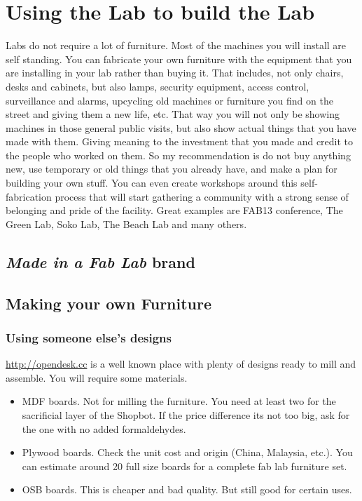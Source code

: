 \documentclass[a4paper,12pt,titlepage]{article}
\begin{document}
\section{Using the Lab to build the Lab}
Labs do not require a lot of furniture. Most of the machines you will install are self standing. You can fabricate your own furniture with the equipment that you are installing in your lab rather than buying it. That includes, not only chairs, desks and cabinets, but also lamps, security equipment, access control, surveillance and alarms, upcycling old machines or furniture you find on the street and giving them a new life, etc. That way you will not only be showing machines in those general public visits, but also show actual things that you have made with them. Giving meaning to the investment that you made and credit to the people who worked on them. So my recommendation is do not buy anything new, use temporary or old things that you already have, and make a plan for building your own stuff. You can even create workshops around this self-fabrication process that will start gathering a community with a strong sense of belonging and pride of the facility. Great examples are FAB13 conference, The Green Lab, Soko Lab, The Beach Lab and many others.

\subsection{\textit{Made in a Fab Lab} brand}

\subsection{Making your own Furniture}

\subsubsection{Using someone else's designs}

\url{http://opendesk.cc} is a well known place with plenty of designs ready to mill and assemble. You will require some materials.
\begin{itemize}
\item MDF boards. Not for milling the furniture. You need at least two for the sacrificial layer of the Shopbot. If the price difference its not too big, ask for the one with no added formaldehydes.
\item Plywood boards. Check the unit cost and origin (China, Malaysia, etc.). You can estimate around 20 full size boards for a complete fab lab furniture set.
\item OSB boards. This is cheaper and bad quality. But still good for certain uses.
\end{itemize}
\end{document}
